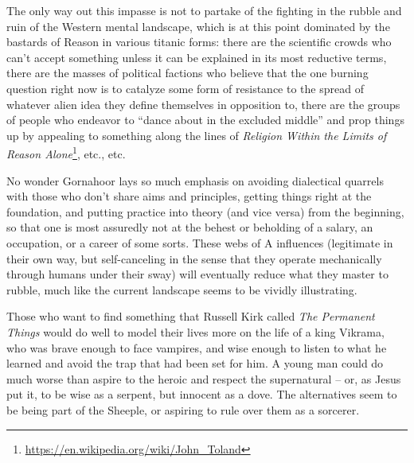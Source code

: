 The only way out this impasse is not to partake of the fighting in the rubble and ruin of the Western mental landscape, which is at this point dominated by the bastards of Reason in various titanic forms: there are the scientific crowds who can't accept something unless it can be explained in its most reductive terms, there are the masses of political factions who believe that the one burning question right now is to catalyze some form of resistance to the spread of whatever alien idea they define themselves in opposition to, there are the groups of people who endeavor to ``dance about in the excluded middle'' and prop things up by appealing to something along the lines of
\emph{Religion Within the Limits of Reason Alone}\footnote{\url{https://en.wikipedia.org/wiki/John_Toland}}, etc., etc.

No wonder Gornahoor lays so much emphasis on avoiding dialectical quarrels with those who don't share aims and principles, getting things right at the foundation, and putting practice into theory (and vice versa) from the beginning, so that one is most assuredly not at the behest or beholding of a salary, an occupation, or a career of some sorts. These webs of A influences (legitimate in their own way, but self-canceling in the sense that they operate mechanically through humans under their sway) will eventually reduce what they master to rubble, much like the current landscape seems to be vividly illustrating.

Those who want to find something that Russell Kirk called \emph{The Permanent Things} would do well to model their lives more on the life of a king Vikrama, who was brave enough to face vampires, and wise enough to listen to what he learned and avoid the trap that had been set for him. A young man could do much worse than aspire to the heroic and respect the supernatural -- or, as Jesus put it, to be wise as a serpent, but innocent as a dove. The alternatives seem to be being part of the Sheeple, or aspiring to rule over them as a sorcerer.



